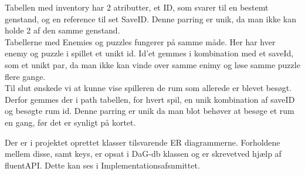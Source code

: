 Tabellen med inventory har 2 atributter, et ID, som svarer til en bestemt genstand, og en reference til set SaveID. Denne parring er unik, da man ikke kan holde 2 af den samme genstand.\\
Tabellerne med Enemies og puzzles fungerer på samme måde. Her har hver enemy og puzzle i spillet et unikt id. Id’et gemmes i kombination med et saveId, som et unikt par, da man ikke kan vinde over samme enimy og løse samme puzzle flere gange.\\
Til slut ønskede vi at kunne vise spilleren de rum som allerede er blevet besøgt. Derfor gemmes der i path tabellen, for hvert spil, en unik kombination af saveID og besøgte rum id. Denne parring er unik da man blot behøver at besøge et rum en gang, før det er synligt på kortet. 

Der er i projektet oprettet klasser tilsvarende ER diagrammerne.
Forholdene mellem disse, samt keys, er opsat i DaG-db klassen og er skrevetved hjælp af fluentAPI. Dette kan ses i Implementationsafsnmittet.
